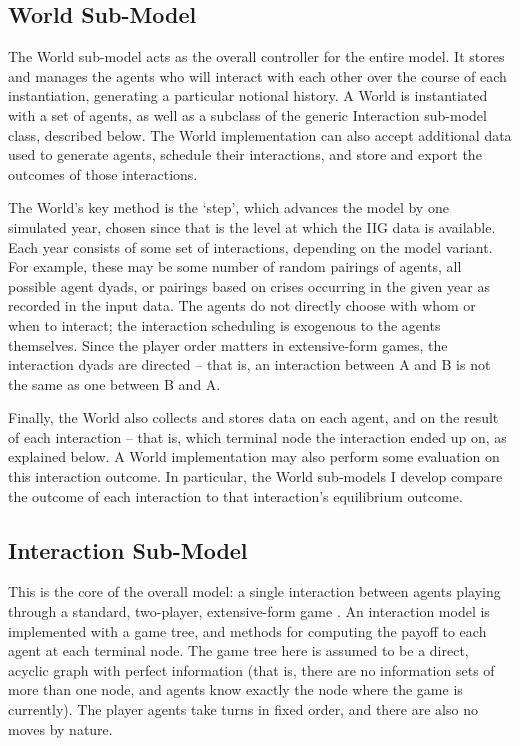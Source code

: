 \subsection{World Sub-Model}

The World sub-model acts as the overall controller for the entire model. It stores and manages the agents who will interact with each other over the course of each instantiation, generating a particular notional history. A World is instantiated with a set of agents, as well as a subclass of the generic Interaction sub-model class, described below. The World implementation can also accept additional data used to generate agents, schedule their interactions, and store and export the outcomes of those interactions.

The World's key method is the `step', which advances the model by one simulated year, chosen since that is the level at which the IIG data is available. Each year consists of some set of interactions, depending on the model variant. For example, these may be some number of random pairings of agents, all possible agent dyads, or pairings based on crises occurring in the given year as recorded in the input data. The agents do not directly choose with whom or when to interact; the interaction scheduling is exogenous to the agents themselves. Since the player order matters in extensive-form games, the interaction dyads are directed -- that is, an interaction between A and B is not the same as one between B and A.

Finally, the World also collects and stores data on each agent, and on the result of each interaction -- that is, which terminal node the interaction ended up on, as explained below. A World implementation may also perform some evaluation on this interaction outcome. In particular, the World sub-models I develop compare the outcome of each interaction to that interaction's equilibrium outcome.

\subsection{Interaction Sub-Model}

This is the core of the overall model: a single interaction between agents playing through a standard, two-player, extensive-form game \citep{shoham_2009}. An interaction model is implemented with a game tree, and methods for computing the payoff to each agent at each terminal node. The game tree here is assumed to be a direct, acyclic graph with perfect information (that is, there are no information sets of more than one node, and agents know exactly the node where the game is currently). The player agents take turns in fixed order, and there are also no moves by nature.

